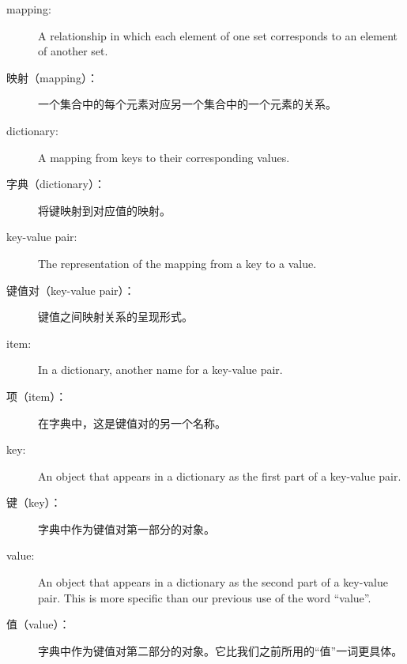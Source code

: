 \begin{description}

\item[mapping:] A relationship in which each element of one set
corresponds to an element of another set.


\item[映射（mapping）：] 一个集合中的每个元素对应另一个集合中的一个元素的关系。


\item[dictionary:] A mapping from keys to their
corresponding values.


\item[字典（dictionary）：] 将键映射到对应值的映射。


\item[key-value pair:] The representation of the mapping from
a key to a value.


\item[键值对（key-value pair）：] 键值之间映射关系的呈现形式。


\item[item:] In a dictionary, another name for a key-value
  pair.


\item[项（item）：] 在字典中，这是键值对的另一个名称。


\item[key:] An object that appears in a dictionary as the
first part of a key-value pair.


\item[键（key）：] 字典中作为键值对第一部分的对象。


\item[value:] An object that appears in a dictionary as the
second part of a key-value pair.  This is more specific than
our previous use of the word ``value''.


\item[值（value）：] 字典中作为键值对第二部分的对象。它比我们之前所用的``值''一词更具体。


\end{description}
